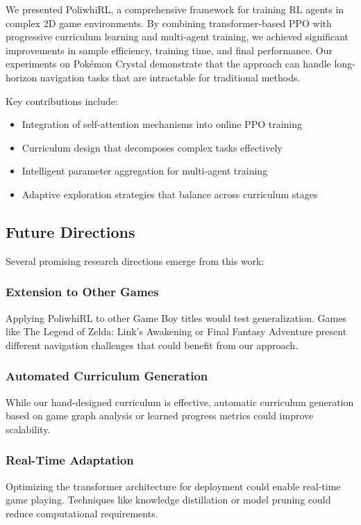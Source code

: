 \documentclass[12pt,a4paper]{article}
\begin{document}
We presented PoliwhiRL, a comprehensive framework for training RL agents in complex 2D game environments. By combining transformer-based PPO with progressive curriculum learning and multi-agent training, we achieved significant improvements in sample efficiency, training time, and final performance. Our experiments on Pokémon Crystal demonstrate that the approach can handle long-horizon navigation tasks that are intractable for traditional methods.

Key contributions include:
\begin{itemize}
    \item Integration of self-attention mechanisms into online PPO training
    \item Curriculum design that decomposes complex tasks effectively  
    \item Intelligent parameter aggregation for multi-agent training
    \item Adaptive exploration strategies that balance across curriculum stages
\end{itemize}

\subsection{Future Directions}

Several promising research directions emerge from this work:

\subsubsection{Extension to Other Games}
Applying PoliwhiRL to other Game Boy titles would test generalization. Games like The Legend of Zelda: Link's Awakening or Final Fantasy Adventure present different navigation challenges that could benefit from our approach.

\subsubsection{Automated Curriculum Generation}
While our hand-designed curriculum is effective, automatic curriculum generation based on game graph analysis or learned progress metrics could improve scalability.

\subsubsection{Real-Time Adaptation}
Optimizing the transformer architecture for deployment could enable real-time game playing. Techniques like knowledge distillation or model pruning could reduce computational requirements.
\end{document}
